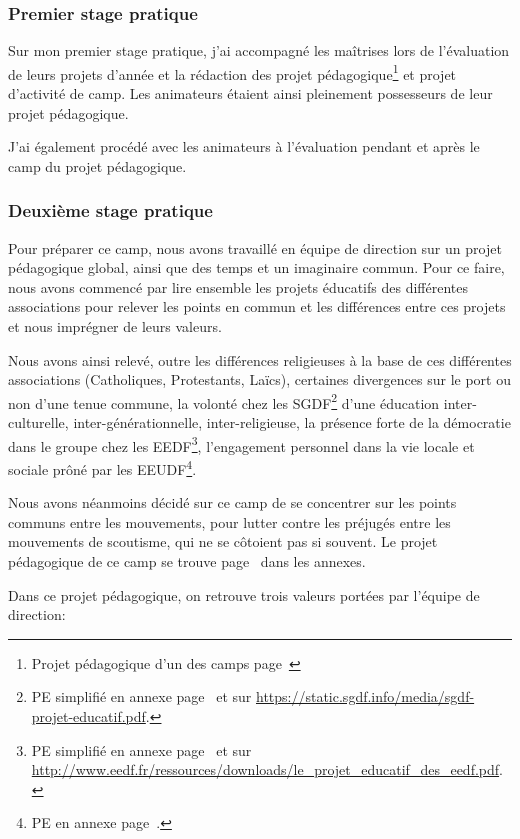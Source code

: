 \documentclass[titlepage,11pt,a4paper]{article}
\begin{document}
\subsubsection{Premier stage pratique}

Sur mon premier stage pratique, j'ai accompagné les maîtrises lors de l'évaluation de
leurs projets d'année et la rédaction des projet pédagogique\footnote{Projet pédagogique
d'un des camps page~\pageref{projetpedmarins}} et projet d'activité de
camp. Les animateurs étaient ainsi pleinement possesseurs de leur projet pédagogique.

J'ai également procédé avec les animateurs à l'évaluation pendant et après le camp du
projet pédagogique.

\subsubsection{Deuxième stage pratique}

Pour préparer ce camp, nous avons travaillé en équipe de direction sur un projet
pédagogique global, ainsi que des temps et un imaginaire commun. Pour ce faire, nous avons
commencé par lire ensemble les projets éducatifs des différentes associations pour relever
les points en commun et les différences entre ces projets et nous imprégner de leurs
valeurs.

Nous avons ainsi relevé, outre les différences religieuses à la base de ces différentes
associations (Catholiques, Protestants, Laïcs), certaines divergences sur
le port ou non d'une tenue commune, la volonté chez les SGDF\footnote{PE simplifié en
annexe page~\pageref{pesgdf} et sur \url{https://static.sgdf.info/media/sgdf-projet-educatif.pdf}.}
d'une éducation inter-culturelle, inter-générationnelle, inter-religieuse, la présence forte de la
démocratie dans le groupe chez les EEDF\footnote{PE simplifié en annexe page~\pageref{peeedf} et sur
\url{http://www.eedf.fr/ressources/downloads/le_projet_educatif_des_eedf.pdf}.}, l'engagement personnel dans la vie locale et
sociale prôné par les EEUDF\footnote{PE en annexe page~\pageref{peeeudf}.}.

Nous avons néanmoins décidé sur ce camp de se concentrer sur les points communs entre les
mouvements, pour lutter contre les préjugés entre les mouvements de scoutisme, qui ne se
côtoient pas si souvent. Le projet pédagogique de ce camp se trouve page~\pageref{projped}
dans les annexes.

Dans ce projet pédagogique, on retrouve trois valeurs portées par l'équipe de direction:
\end{document}
